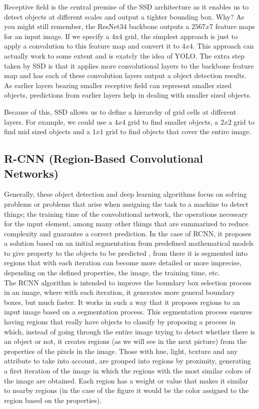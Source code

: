 Receptive field is the central premise of the SSD architecture as it enables us
to detect objects at different scales and output a tighter bounding box. Why? As
you might still remember, the ResNet34 backbone outputs a $256 7x7$ feature maps
for an input image. If we specify a 4x4 grid, the simplest approach is just to
apply a convolution to this feature map and convert it to $4x4$. This approach can
actually work to some extent and is exatcly the idea of YOLO.
The extra step taken by SSD is that it applies more convolutional layers to the
backbone feature map and has each of these convolution layers output a object
detection results. As earlier layers bearing smaller receptive field can
represent smaller sized objects, predictions from earlier layers help in dealing
with smaller sized objects.

Because of this, SSD allows us to define a hierarchy of grid cells at different
layers. For example, we could use a $4x4$ grid to find smaller objects, a $2x2$ grid
to find mid sized objects and a $1x1$ grid to find objects that cover the entire
image.

\subsection{R-CNN (Region-Based Convolutional Networks)}
Generally, these object detection and deep learning algorithms focus on solving
problems or problems that arise when assigning the task to a machine to detect
things; the training time of the convolutional network, the operations necessary
for the input element, among many other things that are summarized to reduce
complexity and guarantee a correct prediction. In the case of RCNN, it proposes
a solution based on an initial segmentation from predefined mathematical models
to give property to the objects to be predicted \cite{rcnn_1}, from there it is
segmented into regions that with each iteration can become more detailed or more
imprecise, depending on the defined properties, the image, the training time,
etc.\\

The RCNN algorithm is intended to improve the boundary box selection process in
an image, where with each iteration, it generates more general boundary boxes,
but much faster. It works in such a way that it proposes regions to an input
image based on a segmentation process. This segmentation process ensures having
regions that really have objects to classify by proposing a process in which,
instead of going through the entire image trying to detect whether there is an
object or not, it creates regions (as we will see in the next picture) from the
properties of the pixels in the image. Those with hue, light, texture and any
attribute to take into account, are grouped into regions by proximity,
generating a first iteration of the image in which the regions with the most
similar colors of the image are obtained. Each region has a weight or value that
makes it similar to nearby regions (in the case of the figure it would be the
color assigned to the region based on the properties).

